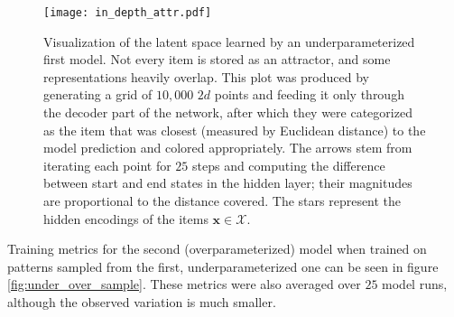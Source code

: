 \documentclass[11pt]{article}
\theoremstyle{remark}
\begin{document}
\begin{figure}
  \centering
  \texttt{[image: in\_depth\_attr.pdf]}
  \caption{Visualization of the latent space learned by an underparameterized first model. Not every item is stored as an attractor, and some representations heavily overlap. This plot was produced by generating a grid of $10,000$ $2d$ points and feeding it only through the decoder part of the network, after which they were categorized as the item that was closest (measured by Euclidean distance) to the model prediction and colored appropriately. The arrows stem from iterating each point for $25$ steps and computing the difference between start and end states in the hidden layer; their magnitudes are proportional to the distance covered. The stars represent the hidden encodings of the items $\bm{x} \in \mathcal{X}$.}
  \label{fig:singlet_attr}
\end{figure}

Training metrics for the second (overparameterized) model when trained on patterns sampled from the first, underparameterized one can be seen in figure \ref{fig:under_over_sample}. These metrics were also averaged over $25$ model runs, although the observed variation is much smaller.
\end{document}
